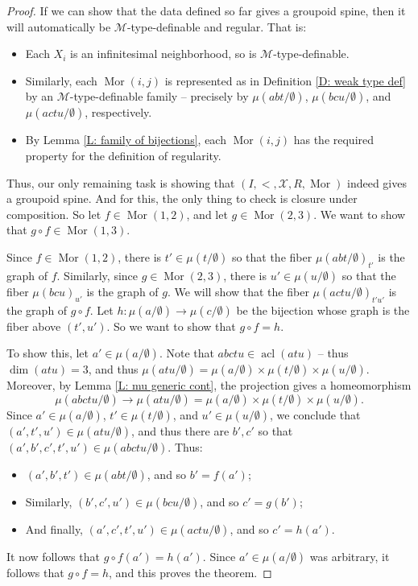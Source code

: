 \documentclass{amsart}
\theoremstyle{definition}
\newcommand{\acl}{\operatorname{acl}}
\begin{document}
\begin{proof}
        If we can show that the data defined so far gives a groupoid spine, then it will automatically be $\mathcal M$-type-definable and regular. That is:
        \begin{itemize}
            \item Each $X_i$ is an infinitesimal neighborhood, so is $\mathcal M$-type-definable.
            \item Similarly, each $\operatorname{Mor}(i,j)$ is represented as in Definition \ref{D: weak type def} by an $\mathcal M$-type-definable family -- precisely  by $\mu(abt/\emptyset)$, $\mu(bcu/\emptyset)$, and $\mu(actu/\emptyset)$, respectively.
            \item By Lemma \ref{L: family of bijections}, each $\operatorname{Mor}(i,j)$ has the required property for the definition of regularity.
        \end{itemize}
        Thus, our only remaining task is showing that $(I,<,\mathcal X,R,\operatorname{Mor})$ indeed gives a groupoid spine. And for this, the only thing to check is closure under composition. So let $f\in\operatorname{Mor}(1,2)$, and let $g\in\operatorname{Mor}(2,3)$. We want to show that $g\circ f\in\operatorname{Mor}(1,3)$.

        Since $f\in\operatorname{Mor}(1,2)$, there is $t'\in\mu(t/\emptyset)$ so that the fiber $\mu(abt/\emptyset)_{t'}$ is the graph of $f$. Similarly, since $g\in\operatorname{Mor}(2,3)$, there is $u'\in\mu(u/\emptyset)$ so that the fiber $\mu(bcu)_{u'}$ is the graph of $g$. We will show that the fiber $\mu(actu/\emptyset)_{t'u'}$ is the graph of $g\circ f$. Let $h:\mu(a/\emptyset)\rightarrow\mu(c/\emptyset)$ be the bijection whose graph is the fiber above $(t',u')$. So we want to show that $g\circ f=h$.

        To show this, let $a'\in\mu(a/\emptyset)$. Note that $abctu\in\acl(atu)$ -- thus $\dim(atu)=3$, and thus $\mu(atu/\emptyset)=\mu(a/\emptyset)\times\mu(t/\emptyset)\times\mu(u/\emptyset)$. Moreover, by Lemma \ref{L: mu generic cont}, the projection gives a homeomorphism $$\mu(abctu/\emptyset)\rightarrow\mu(atu/\emptyset)=\mu(a/\emptyset)\times\mu(t/\emptyset)\times\mu(u/\emptyset).$$ Since $a'\in\mu(a/\emptyset)$, $t'\in\mu(t/\emptyset)$, and $u'\in\mu(u/\emptyset)$, we conclude that $(a',t',u')\in\mu(atu/\emptyset)$, and thus there are $b',c'$ so that $(a',b',c',t',u')\in\mu(abctu/\emptyset)$. Thus:
        \begin{itemize}
            \item $(a',b',t')\in\mu(abt/\emptyset)$, and so $b'=f(a')$;
            \item Similarly, $(b',c',u')\in\mu(bcu/\emptyset)$, and so $c'=g(b')$;
            \item And finally, $(a',c',t',u')\in\mu(actu/\emptyset)$, and so $c'=h(a')$.
        \end{itemize}
        
        It now follows that $g\circ f(a')=h(a')$. Since $a'\in\mu(a/\emptyset)$ was arbitrary, it follows that $g\circ f=h$, and this proves the theorem.
        \end{proof}
\end{document}
